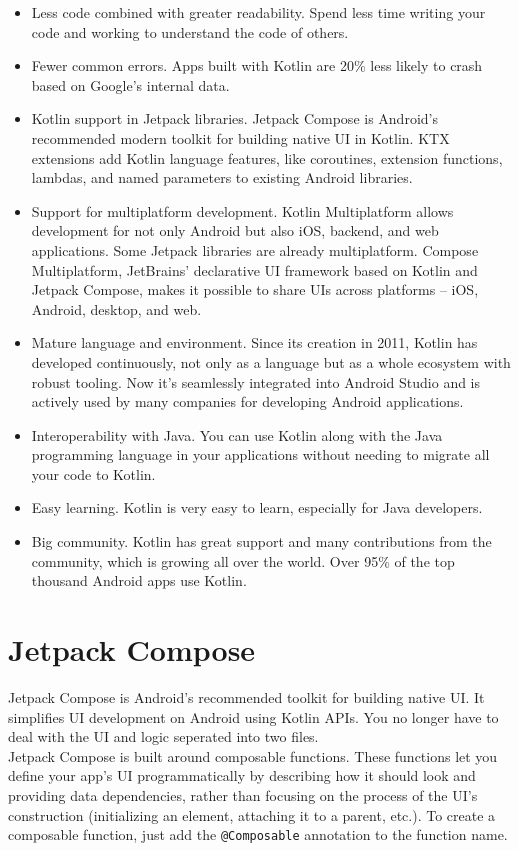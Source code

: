 \documentclass[12pt,oneside]{book}
\begin{document}
\begin{itemize}
    \item Less code combined with greater readability. Spend less time writing your code and working to understand the code of others.
    \item Fewer common errors. Apps built with Kotlin are 20\% less likely to crash based on Google's internal data.
    \item Kotlin support in Jetpack libraries. Jetpack Compose is Android's recommended modern toolkit for building native UI in Kotlin. KTX extensions add Kotlin language features, like coroutines, extension functions, lambdas, and named parameters to existing Android libraries.
    \item Support for multiplatform development. Kotlin Multiplatform allows development for not only Android but also iOS, backend, and web applications. Some Jetpack libraries are already multiplatform. Compose Multiplatform, JetBrains' declarative UI framework based on Kotlin and Jetpack Compose, makes it possible to share UIs across platforms – iOS, Android, desktop, and web.
    \item Mature language and environment. Since its creation in 2011, Kotlin has developed continuously, not only as a language but as a whole ecosystem with robust tooling. Now it's seamlessly integrated into Android Studio and is actively used by many companies for developing Android applications.
    \item Interoperability with Java. You can use Kotlin along with the Java programming language in your applications without needing to migrate all your code to Kotlin.
    \item Easy learning. Kotlin is very easy to learn, especially for Java developers.
    \item Big community. Kotlin has great support and many contributions from the community, which is growing all over the world. Over 95\% of the top thousand Android apps use Kotlin.
\end{itemize}

    \section{Jetpack Compose}
Jetpack Compose is Android’s recommended toolkit for building native UI. It simplifies UI development on Android using Kotlin APIs. You no longer have to deal with the UI and logic seperated into two files. \\

Jetpack Compose is built around composable functions. These functions let you define your app's UI programmatically by describing how it should look and providing data dependencies, rather than focusing on the process of the UI's construction (initializing an element, attaching it to a parent, etc.). To create a composable function, just add the \texttt{@Composable} annotation to the function name.
\end{document}
